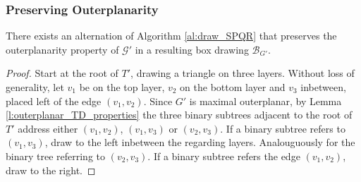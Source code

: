 \subsubsection{Preserving Outerplanarity}

\begin{theorem}
	There exists an alternation of Algorithm \ref{al:draw_SPQR} that preserves the outerplanarity property of $\mathcal{G'}$ in a resulting box drawing $\mathcal{B}_{G'}$.
\end{theorem}
\begin{proof}
	Start at the root of $T'$, drawing a triangle on three layers. Without loss of generality, let $v_1$ be on the top layer, $v_2$ on the bottom layer and $v_3$ inbetween, placed left of the edge $(v_1,v_2)$.
	Since $G'$ is maximal outerplanar, by Lemma \ref{l:outerplanar_TD_properties} the three binary subtrees adjacent to the root of $T'$ address either $(v_1,v_2)$, $(v_1,v_3)$ or $(v_2,v_3)$. If a binary subtree refers to $(v_1,v_3)$, draw to the left inbetween the regarding layers. Analouguously for the binary tree referring to $(v_2,v_3)$. If a binary subtree refers the edge $(v_1,v_2)$, draw to the right. 
	

\end{proof}
